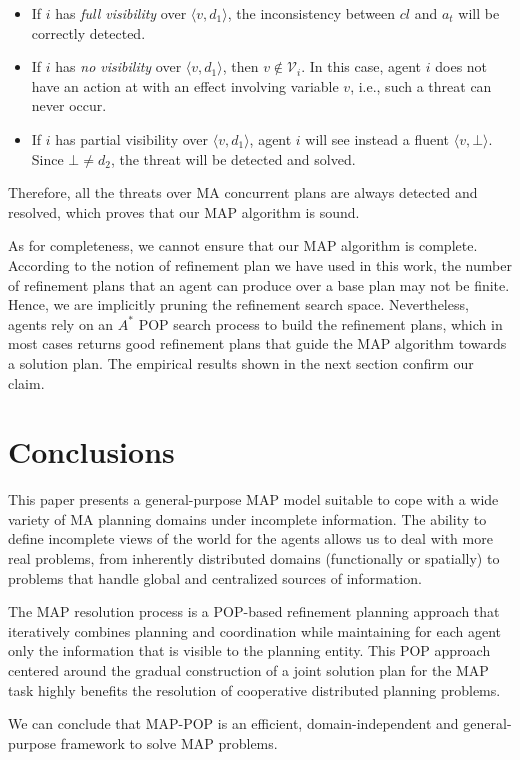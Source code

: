 \documentclass[12pt]{article}
\begin{document}
\begin{itemize}
  \item If $i$ has \textit{full visibility} over $\langle v,d_1\rangle$, the inconsistency between $cl$ and $a_t$ will be correctly detected.
  \item If $i$ has \textit{no visibility} over $\langle v,d_1\rangle$, then $v \notin \mathcal{V}_i$. In this case, agent $i$ does not have an action at with an effect involving variable $v$, i.e., such a threat can never occur.
  \item If $i$ has partial visibility over $\langle v,d_1\rangle$, agent $i$ will see instead a fluent $\langle v,\bot\rangle$. Since $\bot\neq d_2$, the threat will be detected and solved.
\end{itemize}

Therefore, all the threats over MA concurrent plans are always detected and resolved, which proves that our MAP algorithm is sound.

As for completeness, we cannot ensure that our MAP algorithm is complete. According to the notion of refinement plan we have used in this work, the number of refinement plans that an agent can produce over a base plan may not be finite. Hence, we are implicitly pruning the refinement search space. Nevertheless, agents rely on an $A^\ast$ POP search process to build the refinement plans, which in most cases returns good refinement plans that guide the MAP algorithm towards a solution plan. The empirical results shown in the next section confirm our claim.

\section{Conclusions}

This paper presents a general-purpose MAP model suitable to cope with a wide variety of MA planning domains under incomplete information. The ability to define incomplete views of the world for the agents allows us to deal with more real problems, from inherently distributed domains (functionally or spatially) to problems that handle global and centralized sources of information.

The MAP resolution process is a POP-based refinement planning approach that iteratively combines planning and coordination while maintaining for each agent only the information that is visible to the planning entity. This POP approach centered around the gradual construction of a joint solution plan for the MAP task highly benefits the resolution of cooperative distributed planning problems.

We can conclude that MAP-POP is an efficient, domain-independent and general-purpose framework to solve MAP problems.

\newpage
\printbibliography
\end{document}
